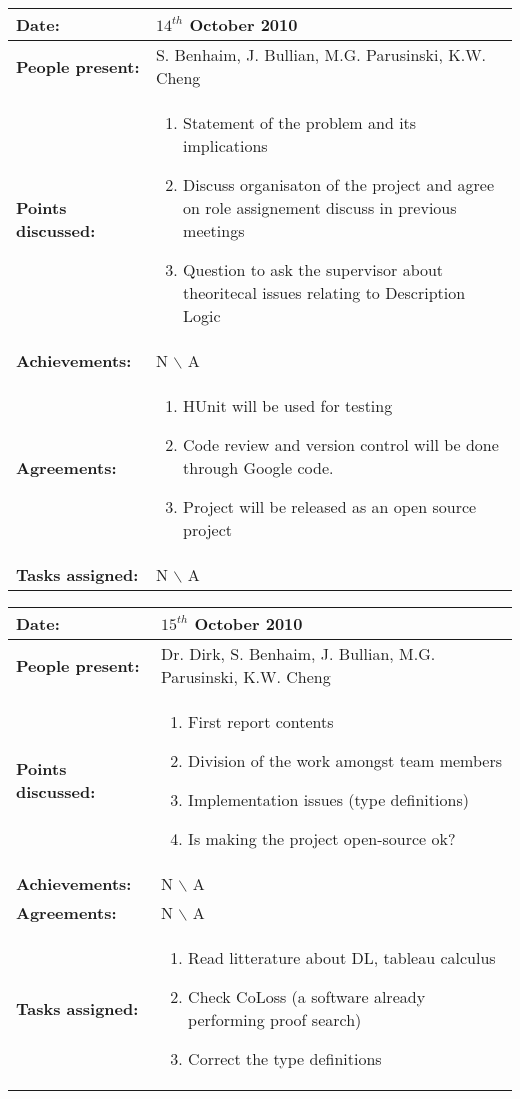 \documentclass[12pt,a4paper]{article}
\newcommand{\meeting}[6]{%
\begin{center}%
\begin{longtable}{| p{3.5cm} | | p{13cm} |}%
\hline%
\textbf{Date:} & #1 \\%
\hline%
\textbf{People present:} &#2 \\%
\hline%
\textbf{Points discussed:} &#3\\%
\hline%
\textbf{Achievements:} &#4 \\%
\hline%
\textbf{Agreements:} &#5 \\%
\hline%
\textbf{Tasks assigned:} &#6  \\%
\hline%
\end{longtable}%
\end{center}%
\bigbreak
}
\begin{document}
\meeting{$14^{th}$ October 2010}%
{S. Benhaim, J. Bullian, M.G. Parusinski, K.W. Cheng}%
{ \begin{enumerate} \item Statement of the problem and its implications 
 \item Discuss organisaton of the project and agree on role assignement discuss in 
previous meetings
\item Question to ask the supervisor about theoritecal issues relating to Description Logic
\end{enumerate} }%
{ N $\backslash$ A}%
{ \begin{enumerate}
\item HUnit will be used for testing
\item Code review and version control will be done through Google code. 
\item Project will be released as an open source project
\end{enumerate}}%
{N $\backslash$ A}

\meeting{$15^{th}$ October 2010}%
{Dr. Dirk, S. Benhaim, J. Bullian, M.G. Parusinski, K.W. Cheng}%
{ \begin{enumerate} \item First report contents
\item Division of the work amongst team members
\item Implementation issues (type definitions)
\item Is making the project open-source ok?
\end{enumerate} }%
{ N $\backslash$ A}%
{N $\backslash$ A}
{ \begin{enumerate}
\item Read litterature about DL, tableau calculus
\item Check CoLoss (a software already performing proof search)
\item Correct the type definitions 
\end{enumerate}}%
\end{document}
